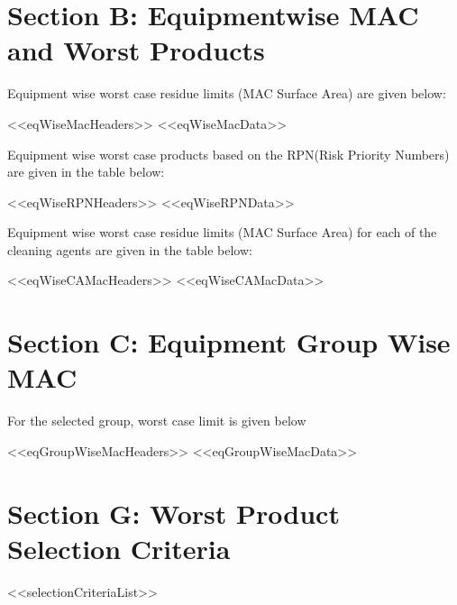 \documentclass{article}
\begin{document}
        \newpage
        \section{Section B: Equipmentwise MAC and Worst Products}
        Equipment wise worst case residue limits (MAC Surface Area) are given below:
        \begin{longtable}[l]{<<eqWiseMacHeaders>>}
        <<eqWiseMacData>>
        \end{longtable}
        Equipment wise worst case products based on the RPN(Risk Priority Numbers) are given in the table below:
        \begin{longtable}[l]{<<eqWiseRPNHeaders>>}
        <<eqWiseRPNData>>
        \end{longtable}
        Equipment wise worst case residue limits (MAC Surface Area) for each of the cleaning agents are given in the table below:
        \begin{longtable}[l]{<<eqWiseCAMacHeaders>>}
        <<eqWiseCAMacData>>
        \end{longtable}
        \newpage
        \section{Section C: Equipment Group Wise MAC}
        For the selected group, worst case limit is given below
        \begin{longtable}[l]{<<eqGroupWiseMacHeaders>>}
        <<eqGroupWiseMacData>>
        \end{longtable}
        \newpage
        \section{Section G: Worst Product Selection Criteria}
        <<selectionCriteriaList>>
        \newpage
\end{document}
